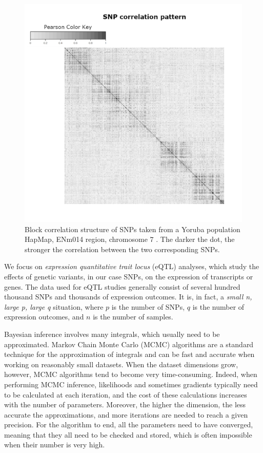\documentclass[a4paper, 11pt]{report}
\numberwithin{equation}{chapter}
\begin{document}
\begin{figure}[h!]
\centering
\includegraphics[width=5in]{images/corrRealSNPs.pdf}
\caption{\label{fig:corr} Block correlation structure of SNPs taken from a Yoruba population HapMap, ENm014 region, chromosome $7$ \citep{hapmap}. The darker the dot, the stronger the correlation between the two corresponding SNPs.}
\end{figure}

We focus on \textit{expression quantitative trait locus} (eQTL) analyses, which study the effects of genetic variants, in our case SNPs, on the expression of transcripts or genes. The data used for eQTL studies generally consist of several hundred thousand SNPs and thousands of expression outcomes. It is, in fact, a \textit{small n, large p, large q} situation, where $p$ is the number of SNPs, $q$ is the number of expression outcomes, and $n$ is the number of samples.

Bayesian inference involves many integrals, which usually need to be approximated. Markov Chain Monte Carlo (MCMC) algorithms are a standard technique for the approximation of integrals and can be fast and accurate when working on reasonably small datasets. When the dataset dimensions grow, however, MCMC algorithms tend to become very time-consuming. Indeed, when performing MCMC inference, likelihoods and sometimes gradients typically need to be calculated at each iteration, and the cost of these calculations increases with the number of parameters. Moreover, the higher the dimension, the less accurate the approximations, and more iterations are needed to reach a given precision. For the algorithm to end, all the parameters need to have converged, meaning that they all need to be checked and stored, which is often impossible when their number is very high.
\end{document}
